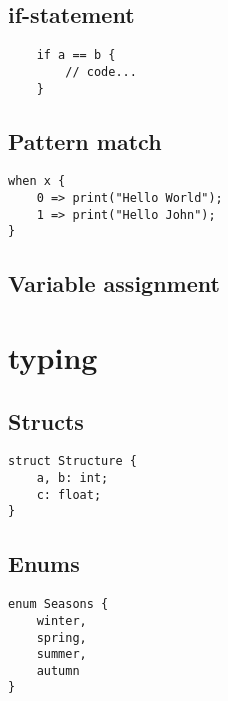 \documentclass{report}
\begin{document}
\subsection{if-statement}
\begin{verbatim}
    if a == b {
        // code...
    }
\end{verbatim}


\subsection {Pattern match}

\begin{verbatim}
when x {
    0 => print("Hello World");
    1 => print("Hello John");
}
\end{verbatim}


\subsection{Variable assignment}

\section {typing}
\subsection {Structs}
\begin{verbatim}
struct Structure {
    a, b: int;
    c: float;
}
\end{verbatim}

\subsection {Enums}
\begin {verbatim}
enum Seasons {
    winter,
    spring,
    summer,
    autumn
}
\end {verbatim}
\end{document}
